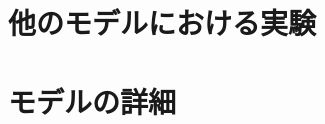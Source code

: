 \documentclass[a4j,12pt]{jreport}
\begin{document}
\acknowledgment





\appendix

\chapter{他のモデルにおける実験}


\chapter{モデルの詳細}

\end{document}
